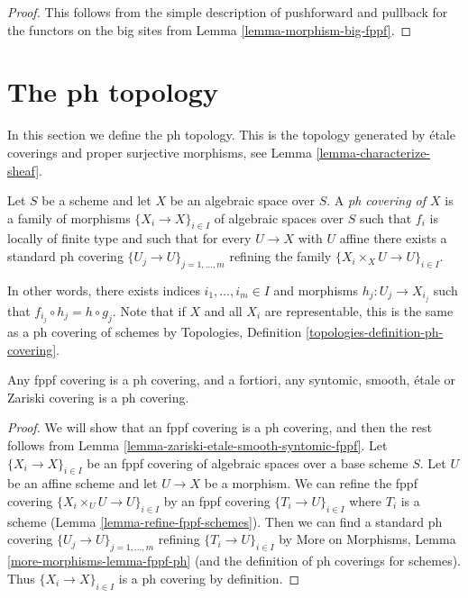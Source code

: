 \begin{proof}
This follows from the simple description of pushforward
and pullback for the functors on the big sites from
Lemma \ref{lemma-morphism-big-fppf}.
\end{proof}








\section{The ph topology}
\label{section-ph}

\noindent
In this section we define the ph topology. This is the topology
generated by \'etale coverings and proper surjective morphisms, see
Lemma \ref{lemma-characterize-sheaf}.

\begin{definition}
\label{definition-ph-covering}
Let $S$ be a scheme and let $X$ be an algebraic space over $S$.
A {\it ph covering of $X$} is a family
of morphisms $\{X_i \to X\}_{i \in I}$ of algebraic spaces over $S$
such that $f_i$ is locally of finite type and such that for every
$U \to X$ with $U$ affine there exists a standard ph covering
$\{U_j \to U\}_{j = 1, \ldots, m}$ refining the family
$\{X_i \times_X U \to U\}_{i \in I}$.
\end{definition}

\noindent
In other words, there exists indices $i_1, \ldots, i_m \in I$ and
morphisms $h_j : U_j \to X_{i_j}$ such that
$f_{i_j} \circ h_j = h \circ g_j$. Note that if $X$ and all $X_i$ are
representable, this is the same as a ph covering of schemes by
Topologies, Definition \ref{topologies-definition-ph-covering}.

\begin{lemma}
\label{lemma-zariski-etale-smooth-syntomic-fppf-ph}
Any fppf covering is a ph covering, and a fortiori,
any syntomic, smooth, \'etale or Zariski covering is a ph covering.
\end{lemma}

\begin{proof}
We will show that an fppf covering is a ph covering, and then the
rest follows from Lemma \ref{lemma-zariski-etale-smooth-syntomic-fppf}.
Let $\{X_i \to X\}_{i \in I}$ be an fppf covering of algebraic spaces
over a base scheme $S$. Let $U$ be an affine scheme and let
$U \to X$ be a morphism. We can refine the fppf covering
$\{X_i \times_U U \to U\}_{i \in I}$ by an fppf covering
$\{T_i \to U\}_{i \in I}$ where $T_i$ is a scheme
(Lemma \ref{lemma-refine-fppf-schemes}).
Then we can find a standard ph covering $\{U_j \to U\}_{j = 1, \ldots, m}$
refining $\{T_i \to U\}_{i \in I}$ by
More on Morphisms, Lemma \ref{more-morphisms-lemma-fppf-ph}
(and the definition of ph coverings for schemes).
Thus $\{X_i \to X\}_{i \in I}$ is a ph covering by definition.
\end{proof}


